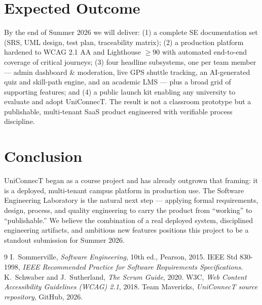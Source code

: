 \documentclass[11pt, a4paper]{article}
\begin{document}
\section{Expected Outcome}

By the end of Summer 2026 we will deliver: (1) a complete SE documentation
set (SRS, UML design, test plan, traceability matrix); (2) a production
platform hardened to WCAG 2.1 AA and Lighthouse $\geq 90$ with automated
end-to-end coverage of critical journeys; (3) four headline subsystems, one
per team member --- admin dashboard \& moderation, live GPS shuttle
tracking, an AI-generated quiz and skill-path engine, and an academic
LMS --- plus a broad grid of supporting features; and (4) a public launch
kit enabling any university to evaluate and adopt UniConnecT. The result is not a classroom prototype but a publishable,
multi-tenant SaaS product engineered with verifiable process discipline.

\section{Conclusion}

UniConnecT began as a course project and has already outgrown that framing:
it is a deployed, multi-tenant campus platform in production use. The
Software Engineering Laboratory is the natural next step --- applying formal
requirements, design, process, and quality engineering to carry the product
from ``working'' to ``publishable.'' We believe the combination of a real
deployed system, disciplined engineering artifacts, and ambitious new
features positions this project to be a standout submission for Summer 2026.

\begin{thebibliography}{9}
 I.~Sommerville, \emph{Software Engineering}, 10th ed., Pearson, 2015.
 IEEE Std 830-1998, \emph{IEEE Recommended Practice for Software Requirements Specifications}.
 K.~Schwaber and J.~Sutherland, \emph{The Scrum Guide}, 2020.
 W3C, \emph{Web Content Accessibility Guidelines (WCAG) 2.1}, 2018.
 Team Mavericks, \emph{UniConnecT source repository}, GitHub, 2026.
\end{thebibliography}
\end{document}
